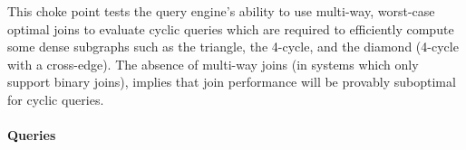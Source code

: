 
This choke point tests the query engine's ability to use multi-way, worst-case optimal joins to evaluate cyclic queries which are required to efficiently compute some dense subgraphs such as the triangle, the 4-cycle, and the diamond (4-cycle with a cross-edge).
The absence of multi-way joins (\eg in systems which only support binary joins), implies that join performance will be provably suboptimal for cyclic queries.


\paragraph{Queries}
{\raggedright

}